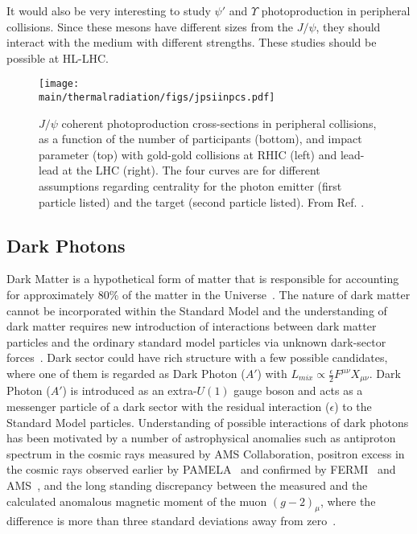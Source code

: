 \documentclass[../report.tex]{subfiles}
\providecommand{\main}{..}
\begin{document}
It would also be very interesting to study $\psi'$ and $\Upsilon$ photoproduction in peripheral collisions.  Since these mesons have different sizes from the $J/\psi$, they should interact with the medium with different strengths.  These studies should be possible at HL-LHC.  

\begin{figure}[htb]
\centering
\texttt{[image: \\main/thermalradiation/figs/jpsiinpcs.pdf]}
\caption{$J/\psi$ coherent photoproduction cross-sections in peripheral collisions, as a function of the number of participants (bottom), and impact parameter (top) with gold-gold collisions at RHIC (left) and lead-lead at the LHC (right).  The four curves are for different assumptions regarding centrality for the photon emitter (first particle listed) and the target (second particle listed).  From Ref. \cite{Zha:2017jch}.}
\label{fig:jpsiinpcs} 
\end{figure}

\newpage
\subsection{Dark Photons }
\label{sec:dileptons:darkphotons}

Dark Matter is a hypothetical form of matter that is responsible for accounting for approximately 80\% of the matter in the Universe~\cite{Planck:2013jfk}.
The nature of dark matter cannot be incorporated within the Standard Model 
and the understanding of dark matter requires new introduction of interactions 
between dark matter particles 
and the ordinary standard model particles via unknown dark-sector forces~\cite{Alexander:2016aln}. 
Dark sector could have rich structure with a few possible candidates, 
where one of them is regarded as Dark Photon ($A'$) with 
$L_{mix} \propto\frac{\epsilon}{2}F^{\mu\nu}X_{\mu\nu}$.
Dark Photon ($A'$) is introduced as an extra-$U(1)$ gauge boson and acts as a messenger particle of a dark sector 
with the residual interaction ($\epsilon$) to the Standard Model particles.
Understanding of possible interactions of dark photons has been motivated by 
a number of astrophysical anomalies such as antiproton spectrum in 
the cosmic rays measured by AMS Collaboration,
positron excess in the cosmic rays observed earlier by PAMELA~\cite{Adriani:2008zr}
and confirmed by FERMI~\cite{FermiLAT:2011ab} and AMS~\cite{Aguilar:2013qda}, 
and the long standing discrepancy
between the measured and the calculated anomalous magnetic moment of 
the muon $(g-2)_{\mu}$, where
the difference is more than three standard deviations away from zero~\cite{Bennett:2006fi}.
\end{document}
